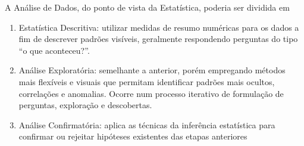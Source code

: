 A Análise de Dados, do ponto de vista da Estatística, poderia ser dividida em
\begin{enumerate}
	\item Estatística Descritiva: utilizar medidas de resumo numéricas para os dados
	      a fim de descrever padrões visíveis, geralmente respondendo perguntas do tipo
	      ``o que aconteceu?''.

	\item Análise Exploratória: semelhante a anterior, porém empregando métodos mais
	      flexíveis e visuais que permitam identificar padrões mais ocultos, correlações e
	      anomalias. Ocorre num processo iterativo de formulação de perguntas, exploração
	      e descobertas.

	\item Análise Confirmatória: aplica as técnicas da inferência estatística para
	      confirmar ou rejeitar hipóteses existentes das etapas anteriores
\end{enumerate}
